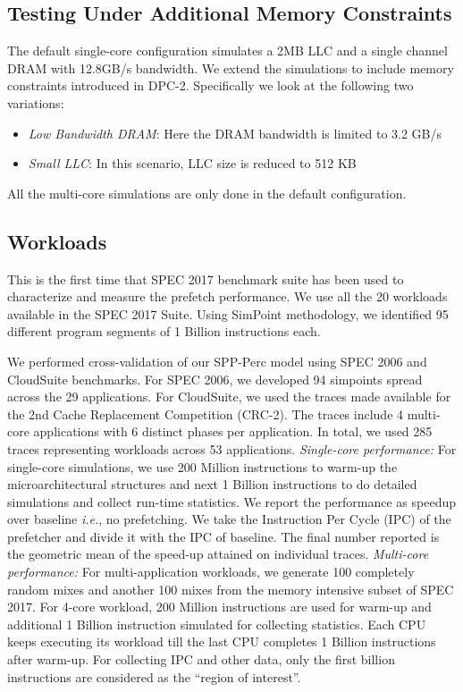 \documentclass{sig-alternate}
\begin{document}
\subsection{Testing Under Additional Memory Constraints}
The default single-core configuration simulates a 2MB LLC and a single channel DRAM with 12.8GB/s bandwidth. 
We extend the simulations to include memory constraints introduced in DPC-2. 
Specifically we look at the following two variations:
\begin{itemize}
    \item \textit{Low Bandwidth DRAM}: Here the DRAM bandwidth is limited to 3.2 GB/s
    \item \textit{Small LLC}: In this scenario, LLC size is reduced to 512 KB
\end{itemize}
All the multi-core simulations are only done in the default configuration.

\subsection{Workloads}
This is the first time that SPEC 2017 benchmark suite\cite{SPEC2017} has been used to characterize and measure the prefetch performance. 
We use all the 20 workloads available in the SPEC 2017 Suite. 
Using SimPoint\cite{SimPoint} methodology, we identified 95 different program segments of 1 Billion instructions each.

We performed cross-validation of our SPP-Perc model using SPEC 2006\cite{SPEC2006} and CloudSuite\cite{CloudSuite} benchmarks.
For SPEC 2006, we developed 94 simpoints spread across the 29 applications.
For CloudSuite, we used the traces made available for the 2nd Cache Replacement Competition (CRC-2)\cite{CRC_2}.
The traces include 4 multi-core applications with 6 distinct phases per application. 
In total, we used 285 traces representing workloads across 53 applications. 
\newline
\newline
\textit{Single-core performance:} For single-core simulations, we use 200 Million instructions to warm-up the microarchitectural structures and next 1 Billion instructions to do detailed simulations and collect run-time statistics. 
We report the performance as speedup over baseline \textit{i.e.}, no prefetching. 
We take the Instruction Per Cycle (IPC) of the prefetcher and divide it with the IPC of baseline. 
The final number reported is the geometric mean of the speed-up attained on individual traces.
\newline
\newline
\textit{Multi-core performance:} For multi-application workloads, we generate 100 completely random mixes and another 100 mixes from the memory intensive subset of SPEC 2017.
For 4-core workload, 200 Million instructions are used for warm-up and additional 1 Billion instruction simulated for collecting statistics. 
Each CPU keeps executing its workload till the last CPU completes 1 Billion instructions after warm-up. 
For collecting IPC and other data, only the first billion instructions are considered as the ``region of interest''. 
\end{document}
